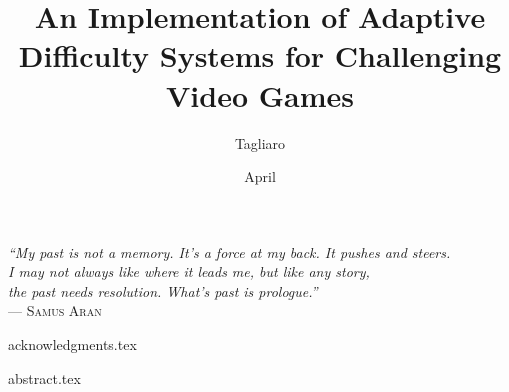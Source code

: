 \documentclass[cic,tc,english,nominata]{resources/documentclass/iiufrgs}
\title{An Implementation of Adaptive Difficulty Systems for Challenging Video Games}
\author{Tagliaro}{Leonardo Ramos Gonzalez}
\date{April}{2022} %
\begin{document}
\maketitle


\clearpage
\begin{flushright}
    \mbox{}\vfill
    {\sffamily\itshape
      ``My past is not a memory. It’s a force at my back. It pushes and steers.\\I may not always like where it leads me, but like any story,\\the past needs resolution. What’s past is prologue.''\\}
    --- \textsc{Samus Aran}
\end{flushright}


{acknowledgments.tex}


{abstract.tex}


\listoffigures     %
\listoftables      %

\end{document}
